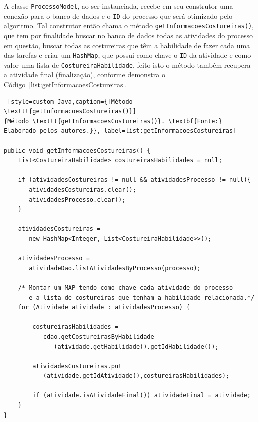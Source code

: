 \par A classe \texttt{ProcessoModel}, ao ser instanciada, recebe em seu construtor uma conexão para o 
banco de dados e o \texttt{ID} do processo que será otimizado pelo algoritmo. Tal construtor então chama o método
\texttt{getInformacoesCostureiras()}, que tem por finalidade buscar no banco de dados todas as atividades do processo em questão, 
buscar todas as costureiras que têm a habilidade de fazer cada uma das tarefas e criar um \texttt{HashMap}, que possui como chave o 
\texttt{ID} da atividade e como valor uma lista de \texttt{CostureiraHabilidade}, feito isto o método também recupera  a 
atividade final (finalização), conforme demonstra o Código~\ref{list:getInformacoesCostureiras}.


\begin{lstlisting} [style=custom_Java,caption={[Método \texttt{getInformacoesCostureiras()}]
{Método \texttt{getInformacoesCostureiras()}. \textbf{Fonte:}
Elaborado pelos autores.}}, label=list:getInformacoesCostureiras]

public void getInformacoesCostureiras() {
	List<CostureiraHabilidade> costureirasHabilidades = null;
	
	if (atividadesCostureiras != null && atividadesProcesso != null){
	   atividadesCostureiras.clear();
	   atividadesProcesso.clear();
	}
	
	atividadesCostureiras = 
	   new HashMap<Integer, List<CostureiraHabilidade>>();
	
	atividadesProcesso = 
	   atividadeDao.listAtividadesByProcesso(processo);
	
	/* Montar um MAP tendo como chave cada atividade do processo 
	   e a lista de costureiras que tenham a habilidade relacionada.*/
	for (Atividade atividade : atividadesProcesso) {
		
		costureirasHabilidades = 
		   cdao.getCostureirasByHabilidade
		      (atividade.getHabilidade().getIdHabilidade());
		
		atividadesCostureiras.put
		   (atividade.getIdAtividade(),costureirasHabilidades);
		
		if (atividade.isAtividadeFinal()) atividadeFinal = atividade;
	}
}

\end{lstlisting}

